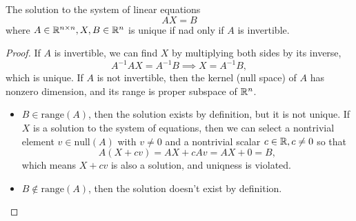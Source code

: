 \begin{theorem}
The solution to the system of linear equations 
\[ AX=B \]
where \(A\in\mathbb{R}^{n\times n}, X,B\in\mathbb{R}^n\) is unique if nad only if $A$ is invertible.
\end{theorem}
\begin{proof}
If $A$ is invertible, we can find $X$ by multiplying both sides by its inverse,
\[ A^{-1}AX=A^{-1}B \implies X=A^{-1}B, \]
which is unique.
If $A$ is not invertible, then the kernel (null space) of $A$ has nonzero dimension, and its range is proper subspace of \(\mathbb{R}^n\).
\begin{itemize}
	\item \(B\in\text{range}(A)\), then the solution exists by definition, but it is not unique.
	If $X$ is a solution to the system of equations, then we can select a nontrivial element \(v\in\text{null}(A)\) with \(v\neq0\) and a nontrivial scalar \(c\in\mathbb{R},c\neq0\) so that
	\[ A(X+cv)=AX+cAv=AX+0=B, \]
	which means \(X+cv\) is also a solution, and uniqness is violated.
	\item \(B\notin\text{range}(A)\), then the solution doesn't exist by definition.
\end{itemize}
\end{proof}


